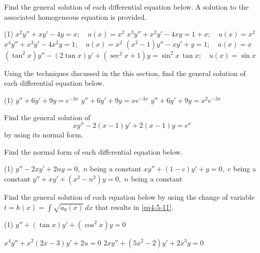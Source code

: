 \begin{Exercise}\label{EX37}
	\vspace{-\baselineskip}%
	
	\Question\label{3-7-1}
Find the general solution of each differential equation below. A solution to the associated homogeneous equation is provided.
	
	\begin{tasks}(1)
		\task \(x^2 y''+x y'-4 y=x; \quad u(x) = x^2\)
		\task \(x^3 y''+x^2 y'-4 x y=1+x; \quad u(x) = x^2\)
		\task \(x^4 y''+x^3 y'-4 x^2 y=1;\quad u(x) = x^2 \)
		\task \((x^2-1)y''-x y'+y=1; \quad u(x) = x\)
		\task \((\tan^2x)y''-(2 \tan x) y'+ \left(\sec ^2x+1\right)y=\sin^2x \, \tan x; \quad u(x) = \sin x\)
		
		
	\end{tasks}
	
	\Question\label{3-7-2}
		Using the techniques discussed in the this section, find the general solution of each differential equation below.
		\begin{tasks}(1)
		\task \(y''+6y'+9y = e^{-3x}\)
		\task \(y''+6y'+9y = xe^{-3x}\)
		\task \(y''+6 y'+9 y=x^2 e^{-3x}\)
		\end{tasks}
		
	\Question\label{3-7-3} Find the general solution of 
	\[xy''-2(x-1)y'+2(x-1)y =e^x\]
by using its normal form. 

	\Question\label{3-7-4}
Find the normal form of each differential equation below.
\begin{tasks}(1)
	\task \(y''-2xy'+2ny=0,\) \quad $n$ being a constant
	\task \(xy''+(1-c)y'+y=0,\) \quad$c$ being a constant
	\task \(y''+xy'+(x^2-n^2)y=0,\) \quad$n$ being a constant
\end{tasks}

\Question\label{3-7-5}
Find the general solution of each equation below by using the change of variable $t= h(x) = \int \sqrt{a_0(x)}\, dx$ that results  in \eqref{eq4-5-11}.
\begin{tasks}(1)
	\task \(y''+ (\tan x) y'+(\cos^2x)y =0\)
	
	\task \(x^4y''+x^2(2x-3)y'+2u =0\) 
	\task \(2xy''+(5x^2-2)y'+2x^3y=0\) 
\end{tasks}

\end{Exercise}

